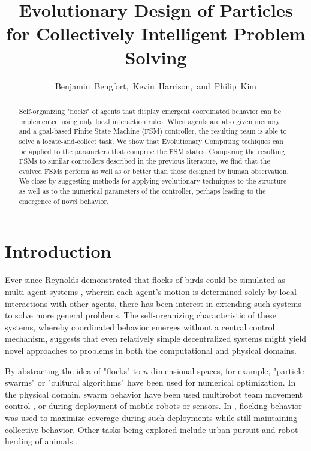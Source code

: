 \documentclass[12pt,journal,compsoc]{IEEEtran}
\begin{document}
\title{Evolutionary Design of Particles for Collectively Intelligent Problem Solving}
\author{Benjamin~Bengfort,~Kevin~Harrison,~and~Philip~Kim}

\maketitle

\begin{abstract}

Self-organizing "flocks" of agents that display emergent coordinated behavior can be implemented using only local interaction rules. When agents are also given memory and a goal-based Finite State Machine (FSM) controller, the resulting team is able to solve a locate-and-collect task. We show that Evolutionary Computing techiques can be applied to the parameters that comprise the FSM states. Comparing the resulting FSMs to similar controllers described in the previous literature, we find that the evolved FSMs perform as well as or better than those designed by human  observation. We close by suggesting methods for applying evolutionary techniques to the structure as well as to the numerical parameters of the controller, perhaps leading to the emergence of novel behavior.

\end{abstract}

\section{Introduction}

Ever since Reynolds demonstrated that flocks of birds could be simulated as multi-agent systems \cite{reynolds1987flocks}, wherein each agent's motion is determined solely by local interactions with other agents, there has been interest in extending such systems to solve more general problems. The self-organizing characteristic of these systems, whereby coordinated behavior emerges without a central control mechanism, suggests that even relatively simple decentralized systems might yield novel approaches to problems in both the computational and physical domains. 

By abstracting the idea of "flocks" to $n$-dimensional spaces, for example, "particle swarms" \cite{kennedy1995particle,clerc2002particle} or "cultural algorithms" \cite{chung1996testbed} have been used for numerical optimization. In the physical domain, swarm behavior have been used multirobot team movement control \cite{balch1998behavior,ccelikkanat2010steering,hodgins1994robot}, or during deployment of mobile robots or sensors. In \cite{cheng2009distributed}, flocking behavior was used to maximize coverage during such deployments while still maintaining collective behavior. Other tasks being explored include urban pursuit \cite{winder2004using} and robot herding of animals \cite{vaughan1998robot}.
\end{document}
